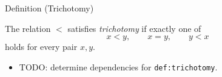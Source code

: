 \begin{definitionbox}{Definition (Trichotomy)}
\begin{definition}[Trichotomy]
\label{def:trichotomy}
The relation $<$ satisfies \emph{trichotomy} if exactly one of
\[
x<y,\qquad x=y,\qquad y<x
\]
holds for every pair $x,y$.
\end{definition}
\end{definitionbox}

\begin{dependencies}
\begin{itemize}
  \item TODO: determine dependencies for \texttt{def:trichotomy}.
\end{itemize}
\end{dependencies}
